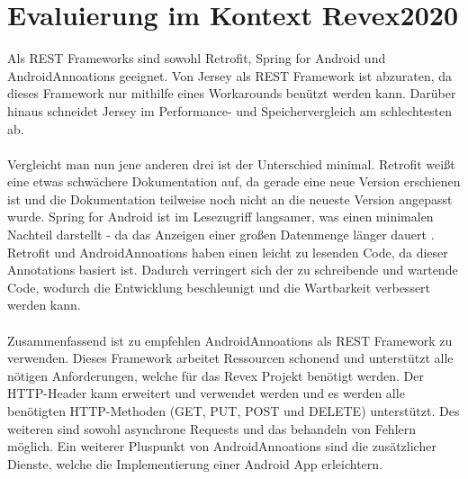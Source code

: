 \section{Evaluierung im Kontext Revex2020}
Als REST Frameworks sind sowohl Retrofit, Spring for Android und AndroidAnnoations geeignet. Von Jersey als REST Framework ist abzuraten, da dieses Framework nur mithilfe eines Workarounds benützt werden kann. Darüber hinaus schneidet Jersey im Performance- und Speichervergleich am schlechtesten ab.
\\\\
Vergleicht man nun jene anderen drei ist der Unterschied minimal. Retrofit weißt eine etwas schwächere Dokumentation auf, da gerade eine neue Version erschienen ist und die Dokumentation teilweise noch nicht an die neueste Version angepasst wurde. Spring for Android ist im Lesezugriff langsamer, was einen minimalen Nachteil darstellt - da das Anzeigen einer großen Datenmenge länger dauert . Retrofit und AndroidAnnoations haben einen leicht zu lesenden Code, da dieser Annotations basiert ist. Dadurch verringert sich der zu schreibende und wartende Code, wodurch die Entwicklung beschleunigt und die Wartbarkeit verbessert werden kann.
\\\\
Zusammenfassend ist zu empfehlen AndroidAnnoations als REST Framework zu verwenden. Dieses Framework arbeitet Ressourcen schonend und unterstützt alle nötigen Anforderungen, welche für das Revex Projekt benötigt werden. Der HTTP-Header kann erweitert und verwendet werden und es werden alle benötigten HTTP-Methoden (GET, PUT, POST und DELETE) unterstützt. Des weiteren sind sowohl asynchrone Requests und das behandeln von Fehlern möglich. Ein weiterer Pluspunkt von  AndroidAnnoations sind die zusätzlicher Dienste, welche die Implementierung einer Android App erleichtern.

